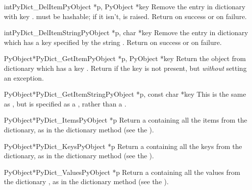 \begin{cfuncdesc}{int}{PyDict_DelItem}{PyObject *p, PyObject *key}
  Remove the entry in dictionary  with key .
   must be hashable; if it isn't,  is
  raised.  Return  on success or  on failure.
\end{cfuncdesc}

\begin{cfuncdesc}{int}{PyDict_DelItemString}{PyObject *p, char *key}
  Remove the entry in dictionary  which has a key specified by
  the string .  Return  on success or  on
  failure.
\end{cfuncdesc}

\begin{cfuncdesc}{PyObject*}{PyDict_GetItem}{PyObject *p, PyObject *key}
  Return the object from dictionary  which has a key
  .  Return \NULL{} if the key  is not present, but
  \emph{without} setting an exception.
\end{cfuncdesc}

\begin{cfuncdesc}{PyObject*}{PyDict_GetItemString}{PyObject *p, const char *key}
  This is the same as , but  is
  specified as a , rather than a .
\end{cfuncdesc}

\begin{cfuncdesc}{PyObject*}{PyDict_Items}{PyObject *p}
  Return a  containing all the items from the
  dictionary, as in the dictionary method  (see the
  ).
\end{cfuncdesc}

\begin{cfuncdesc}{PyObject*}{PyDict_Keys}{PyObject *p}
  Return a  containing all the keys from the
  dictionary, as in the dictionary method  (see the
  ).
\end{cfuncdesc}

\begin{cfuncdesc}{PyObject*}{PyDict_Values}{PyObject *p}
  Return a  containing all the values from the
  dictionary , as in the dictionary method 
  (see the ).
\end{cfuncdesc}

